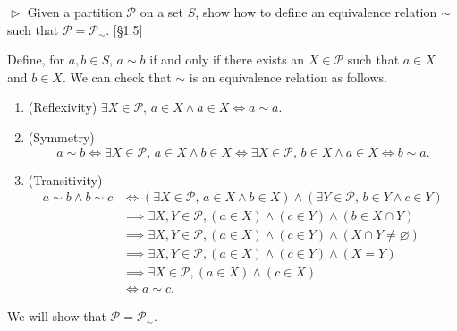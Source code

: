 \documentclass[12pt,letterpaper,boxed]{hmcpset}
\begin{document}
\begin{problem}[1.3]
	$\vartriangleright$ Given a partition $\mathscr{P}$ on a set $S$, show how to define an equivalence relation $\sim$ such that $\mathscr{P} = \mathscr{P}_{\sim}$. [\S1.5]
\end{problem}

\begin{solution}
	Define, for $a,b\in S$, $a\sim b$ if and only if there exists
	an $X\in\mathscr{P}$ such that $a\in X$ and $b\in X$. We can check that $\sim$ is an equivalence relation as follows.
	\begin{enumerate}
		\item (Reflexivity) $\exists X\in\mathscr{P},\,a\in X \land a\in X\iff a\sim a$.
		\item (Symmetry) \[a\sim b\iff\exists X\in\mathscr{P},\,a\in X \land b\in X\iff\exists X\in\mathscr{P},\,b\in X \land a\in X\iff b\sim a.\]
		\item (Transitivity) 
		\begin{align*}
			a\sim b\land b\sim c&\iff\left(\exists X\in\mathscr{P},\,a\in X \land b\in X\right)\land\left(\exists Y\in\mathscr{P},\,b\in Y \land c\in Y\right)\\
			&\implies \exists X, Y\in\mathscr{P}, \left(a\in X \right)\land\left(c\in Y\right)\land\left(b\in X\cap Y\right)\\
			&\implies \exists X, Y\in\mathscr{P}, \left(a\in X \right)\land\left(c\in Y\right)\land\left( X\cap Y\ne \varnothing\right)\\
			&\implies \exists X, Y\in\mathscr{P}, \left(a\in X \right)\land\left(c\in Y\right)\land\left( X= Y\right)\\
			&\implies\exists X\in\mathscr{P},\left(a\in X\right)\land (c\in X)\\
			&\iff 	a\sim c.
		\end{align*}
	\end{enumerate}
	We will show that
	$\mathscr{P} = \mathscr{P}_{\sim}$. 
		

\end{solution}
\end{document}
